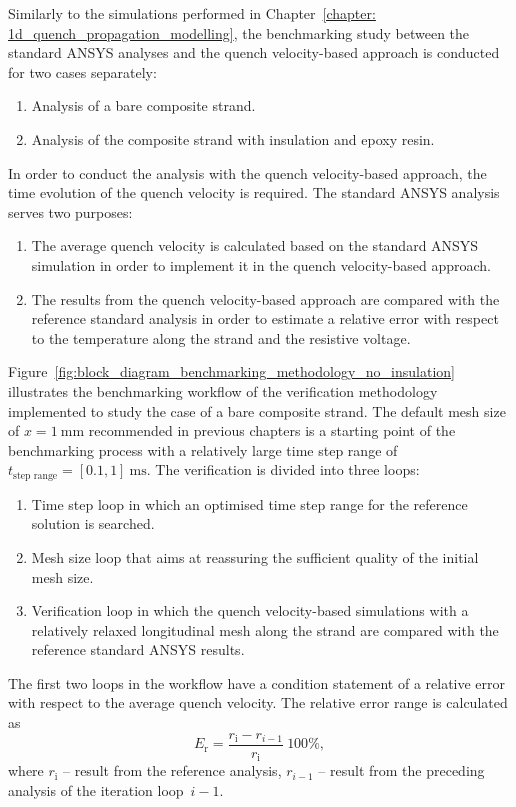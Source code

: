 
Similarly to the simulations performed in Chapter~\ref{chapter: 1d_quench_propagation_modelling}, the benchmarking study between the standard ANSYS analyses and the quench velocity-based approach is conducted for two cases separately: 
\begin{enumerate}
    \item Analysis of a bare composite strand.
    \item Analysis of the composite strand with insulation and epoxy resin.
\end{enumerate}

In order to conduct the analysis with the quench velocity-based approach, the time evolution of the quench velocity is required. The standard ANSYS analysis serves two purposes:
\begin{enumerate}
    \item The average quench velocity is calculated based on the standard ANSYS simulation in order to implement it in the quench velocity-based approach.
    \item The results from the quench velocity-based approach are  compared with the reference standard analysis in order to estimate a relative error with respect to the temperature along the strand and the resistive voltage.
\end{enumerate}

Figure~\ref{fig:block_diagram_benchmarking_methodology_no_insulation} illustrates the benchmarking workflow of the verification methodology implemented to study the case of a bare composite strand. The default mesh size of $x=1~\text{mm}$ recommended in previous chapters is a starting point of the benchmarking process with a relatively large time step range of $t_\text{step range}= [0.1, 1]~\text{ms}$. The verification is divided into three loops: 
\begin{enumerate}
    \item Time step loop in which an optimised time step range for the reference solution is searched.
    \item Mesh size loop that aims at reassuring the sufficient quality of the initial mesh size. 
    \item Verification loop in which the quench velocity-based simulations with a relatively relaxed longitudinal mesh along the strand are compared with the reference standard ANSYS results.
\end{enumerate}

The first two loops in the workflow have a condition statement of a relative error with respect to the average quench velocity. The relative error range is calculated as 
\begin{equation}
    E_\text{r} = \frac{r_\text{i}-r_{i-1}}{r_\text{i}}~100\%,
    \label{eqn:condition_statement_relative_error_v_quench}
\end{equation}
where $r_\text{i}$ -- result from the reference analysis, $r_{i-1}$ -- result from the preceding analysis of the iteration loop~$i-1$.

